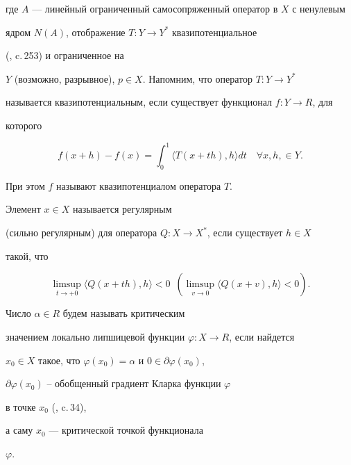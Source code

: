 где $A$ --- линейный ограниченный самосопряженный оператор в $X$ с ненулевым 


ядром $N(A)$, отображение $T:Y \to Y^{*}$ квазипотенциальное


(\cite{n13}, c.\,253) и ограниченное на


$Y$ (возможно, разрывное), $p \in X$. Напомним, что оператор $T:Y \to Y^{*}$


называется квазипотенциальным, если существует функционал $f:Y \to R$, для


которого


$$


f(x+h)-f(x)= \int_0^1 \langle T(x+th),h \rangle dt \quad \forall x,h, \in Y.


$$


При этом $f$ называют квазипотенциалом оператора $T$.





\begin{defns}


Элемент $x \in X$ называется регулярным \cite{n14}


(сильно регулярным) для оператора $Q:X \to X^{*}$, если существует $h \in X$


такой, что


$$


\limsup_{t \to +0} \langle Q(x+th),h \rangle < 0 \ \;


(\limsup_{v \to 0} \langle Q(x+v),h \rangle < 0).


$$


\end{defns}





\begin{defns}


Число $\alpha \in R$ будем называть критическим


значением локально липшицевой функции $\varphi: X \to R $, если найдется


$x_{0} \in X$ такое, что $\varphi(x_0)=\alpha$ и $0 \in\partial\varphi(x_0)$,


$\partial\varphi(x_0)$ -- обобщенный градиент Кларка функции $\varphi$


в точке $x_{0}$ (\cite{n15}, c.\,34),


а саму $x_{0}$ --- критической точкой функционала


$\varphi$.


\end{defns}






